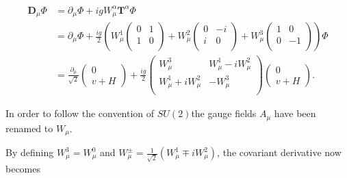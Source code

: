 \documentclass{article}
\begin{document}
\begin{equation}
\begin{split}
\bm{D}_\mu \Phi & = \partial_\mu \Phi + igW^{\alpha}_\mu \bm{T}^\alpha \Phi \\
& = \partial_\mu \Phi + \frac{ig}{2}\left( W^{1}_\mu \left(
\begin{matrix}
0 & 1 \\
1 & 0 \\
\end{matrix}\right) + W^{2}_\mu \left(
\begin{matrix}
0 & -i \\
i & 0 \\
\end{matrix}\right) + W^{3}_\mu \left(
\begin{matrix}
1 & 0 \\
0 & -1 \\
\end{matrix}\right)\right)\Phi\\
& = \frac{\partial_\mu}{\sqrt{2}}\left(\begin{matrix}
0 \\
v + H
\end{matrix}\right) + \frac{ig}{2}\left(\begin{matrix}
W^{3}_\mu & W^{1}_\mu -iW^{2}_\mu \\
W^{1}_\mu + iW^{2}_\mu & -W^{3}_\mu\\
\end{matrix}\right)\left(\begin{matrix}
0 \\
v + H
\end{matrix}\right).
\end{split}
\end{equation}

In order to follow the convention of $SU(2) $the gauge fields $A_\mu$ have been renamed to $W_\mu$.

By defining $W^{3}_\mu = W^{0}_\mu$ and $W^{\pm}_\mu = \frac{1}{\sqrt{2}}(W^{1}_\mu \mp iW^{2}_\mu)$, the covariant derivative now becomes
\end{document}
